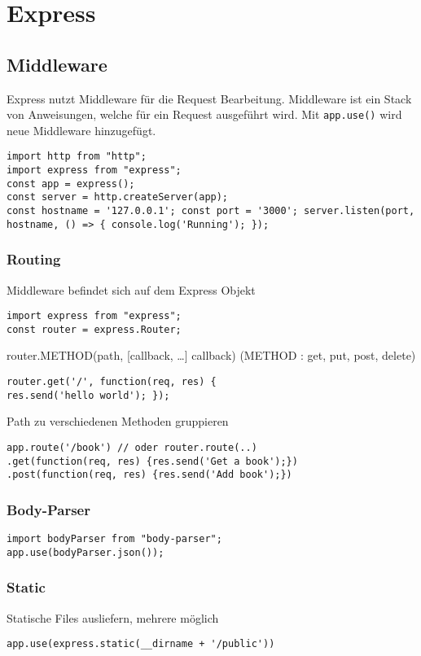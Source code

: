 
\section{Express}

\subsection{Middleware}
Express nutzt Middleware für die Request Bearbeitung. Middleware ist ein Stack von Anweisungen, welche für ein Request ausgeführt wird. Mit \texttt{app.use()} wird neue Middleware hinzugefügt.
\begin{lstlisting}
import http from "http";
import express from "express";
const app = express();
const server = http.createServer(app);
const hostname = '127.0.0.1'; const port = '3000'; server.listen(port, hostname, () => { console.log('Running'); });
\end{lstlisting}

\subsubsection{Routing}
Middleware befindet sich auf dem Express Objekt
\begin{lstlisting}
import express from "express";
const router = express.Router;
\end{lstlisting}
router.METHOD(path, [callback, \dots ] callback)  (METHOD : get, put, post, delete)
\begin{lstlisting}
router.get('/', function(req, res) {
res.send('hello world'); });
\end{lstlisting}
Path zu verschiedenen Methoden gruppieren
\begin{lstlisting}
app.route('/book') // oder router.route(..)
.get(function(req, res) {res.send('Get a book');})
.post(function(req, res) {res.send('Add book');})
\end{lstlisting}

\subsubsection{Body-Parser}
\begin{lstlisting}
import bodyParser from "body-parser";
app.use(bodyParser.json());
\end{lstlisting}

\subsubsection{Static}
Statische Files ausliefern, mehrere möglich
\begin{lstlisting}
app.use(express.static(__dirname + '/public'))
\end{lstlisting}

